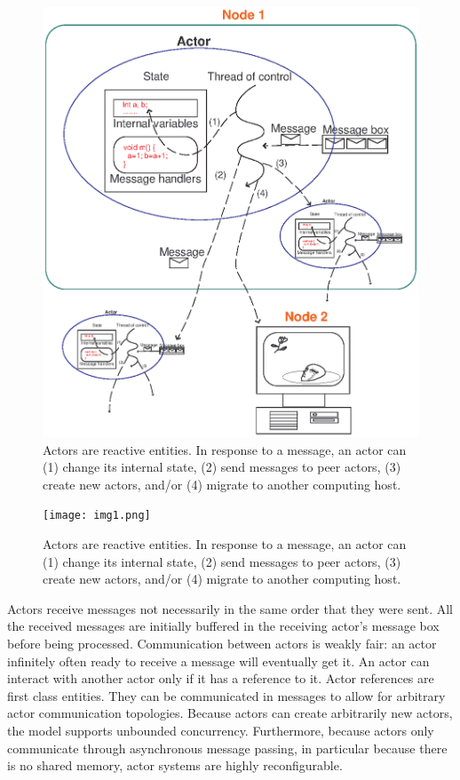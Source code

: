 \begin{figure}
\vspace{2.0in}
\begin{center}
\includegraphics[angle=0,scale=0.75]{fig1.eps}
\caption{Actors are reactive entities.  In response to a message, an
actor can (1) change its internal state, 
(2) send messages to peer actors, 
(3) create new actors, 
and/or (4) migrate to another computing host.}
\label{fig1}
\end{center}
\end{figure}
\begin{htmlonly}
\begin{figure}
 \texttt{[image: img1.png]}
\caption{Actors are reactive entities.  In response to a message, an
actor can (1) change its internal state, 
(2) send messages to peer actors, 
(3) create new actors, 
and/or (4) migrate to another computing host.}
\label{fig1}
\end{figure}
\end{htmlonly}

Actors receive messages not necessarily in the same order that they 
were sent. All the received messages are initially buffered in the 
receiving actor's message box before being processed. 
Communication between actors is weakly fair: an actor infinitely 
often ready to receive a message will eventually get it. An actor can 
interact with another actor only if it has a reference to it. Actor 
references are first class entities. They can be communicated in 
messages to allow for arbitrary actor communication topologies. 
Because actors can create arbitrarily new actors, the model supports
unbounded concurrency. Furthermore, because actors only communicate
through asynchronous message passing, in particular because there is
no shared memory, actor systems are highly reconfigurable.

